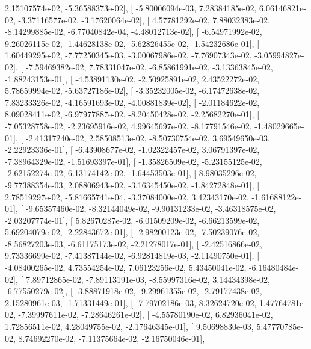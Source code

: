 \documentclass{article}
\begin{document}
          2.15107574e-02,  -5.36588373e-02],
       [ -5.80006094e-03,   7.28384185e-02,   6.06146821e-02,
         -3.37116577e-02,  -3.17620064e-02],
       [  4.57781292e-02,   7.88032383e-02,  -8.14299885e-02,
         -6.77040842e-04,  -4.48012713e-02],
       [ -6.54971992e-02,   9.26026115e-02,  -1.44628138e-02,
         -5.62826455e-02,  -1.54232686e-01],
       [  1.60449295e-02,  -7.77250345e-03,  -3.00067986e-02,
         -7.76907343e-02,  -3.05994827e-02],
       [ -7.59469382e-02,   7.78331047e-02,  -6.85861991e-02,
         -3.13363845e-02,  -1.88243153e-01],
       [ -4.53891130e-02,  -2.50925891e-02,   2.43522272e-02,
          5.78659994e-02,  -5.63727186e-02],
       [ -3.35232005e-02,  -6.17472638e-02,   7.83233326e-02,
         -4.16591693e-02,  -4.00881839e-02],
       [ -2.01184622e-02,   8.09028411e-02,  -6.97977887e-02,
         -8.20450428e-02,  -2.25682270e-01],
       [ -7.05328758e-02,  -2.23695916e-02,   4.99645697e-02,
         -8.17791546e-02,  -1.48029665e-01],
       [ -2.41317240e-02,   2.58508513e-02,  -8.50730754e-02,
          3.69549650e-03,  -2.22923336e-01],
       [ -6.43908677e-02,  -1.02322457e-02,   3.06791397e-02,
         -7.38964329e-02,  -1.51693397e-01],
       [ -1.35826509e-02,  -5.23155125e-02,  -2.62152274e-02,
          6.13174142e-02,  -1.64453503e-01],
       [  8.98035296e-02,  -9.77388354e-03,   2.08806943e-02,
         -3.16345450e-02,  -1.84272848e-01],
       [  2.78519297e-02,  -5.81665741e-04,  -3.37084000e-02,
          3.42343170e-02,  -1.61688122e-01],
       [ -9.65357460e-02,  -8.32144049e-02,  -9.90131233e-02,
         -3.46318575e-02,  -2.03207774e-01],
       [  5.82670287e-02,  -6.01509209e-02,  -6.66213599e-02,
          5.69204079e-02,  -2.22843672e-01],
       [ -2.98200123e-02,  -7.50239076e-02,  -8.56827203e-03,
         -6.61175173e-02,  -2.21278017e-01],
       [ -2.42516866e-02,   9.73336699e-02,  -7.41387144e-02,
         -6.92814819e-03,  -2.11490750e-01],
       [ -4.08400265e-02,   4.73554254e-02,   7.06123256e-02,
          5.43450041e-02,  -6.16480484e-02],
       [  7.89712865e-02,  -7.89113191e-03,  -8.55997316e-02,
          3.14434398e-02,  -6.77550279e-02],
       [ -3.88871918e-02,  -9.29961355e-02,  -2.79177438e-02,
          2.15280961e-03,  -1.71331449e-01],
       [ -7.79702186e-03,   8.32624720e-02,   1.47764781e-02,
         -7.39997611e-02,  -7.28646261e-02],
       [ -4.55780190e-02,   6.82936041e-02,   1.72856511e-02,
          4.28049755e-02,  -2.17646345e-01],
       [  9.50698830e-03,   5.47770785e-02,   8.74692270e-02,
         -7.11375664e-02,  -2.16750046e-01],
\end{document}
